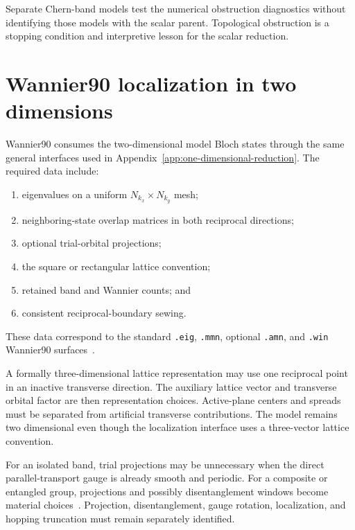 Separate Chern-band models test the numerical obstruction diagnostics without
identifying those models with the scalar parent. Topological obstruction is a
stopping condition and interpretive lesson for the scalar reduction.

\section{Wannier90 localization in two dimensions}

Wannier90 consumes the two-dimensional model Bloch states through the same
general interfaces used in Appendix~\ref{app:one-dimensional-reduction}. The
required data include:
\begin{enumerate}
    \item eigenvalues on a uniform $N_{k_x}\times N_{k_y}$ mesh;
    \item neighboring-state overlap matrices in both reciprocal directions;
    \item optional trial-orbital projections;
    \item the square or rectangular lattice convention;
    \item retained band and Wannier counts; and
    \item consistent reciprocal-boundary sewing.
\end{enumerate}
These data correspond to the standard \texttt{.eig}, \texttt{.mmn}, optional
\texttt{.amn}, and \texttt{.win} Wannier90 surfaces~\cite{pizzi2020}.

A formally three-dimensional lattice representation may use one reciprocal
point in an inactive transverse direction. The auxiliary lattice vector and
transverse orbital factor are then representation choices. Active-plane centers
and spreads must be separated from artificial transverse contributions. The
model remains two dimensional even though the localization interface uses a
three-vector lattice convention.

For an isolated band, trial projections may be unnecessary when the direct
parallel-transport gauge is already smooth and periodic. For a composite or
entangled group, projections and possibly disentanglement windows become
material choices~\cite{souza2001}. Projection, disentanglement, gauge rotation,
localization, and hopping truncation must remain separately identified.

